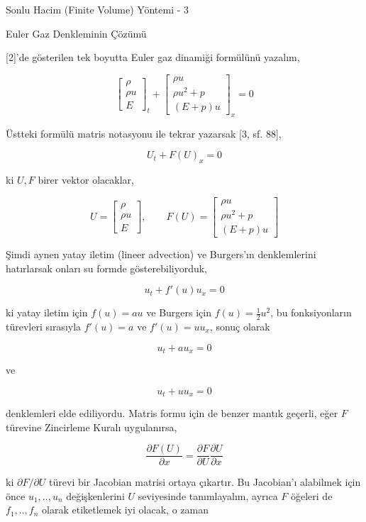 \documentclass[12pt,fleqn]{article}\usepackage{../../common}
\begin{document}
Sonlu Hacim (Finite Volume) Yöntemi - 3

Euler Gaz Denkleminin Çözümü

[2]'de gösterilen tek boyutta Euler gaz dinamiği formülünü yazalım,

$$
\left[\begin{array}{c}
\rho \\ \rho u  \\ E
\end{array}\right]_t
+
\left[\begin{array}{c}
\rho u \\ \rho u^2 + p \\ (E+p) u 
\end{array}\right]_x 
= 0
$$

Üstteki formülü matris notasyonu ile tekrar yazarsak [3, sf. 88],

$$
U_t + F(U)_x = 0
$$

ki $U,F$ birer vektor olacaklar,

$$
U = \left[\begin{array}{c}
\rho \\ \rho u  \\ E
\end{array}\right], \qquad
F(U) =
\left[\begin{array}{c}
\rho u \\ \rho u^2 + p \\ (E+p) u 
\end{array}\right]
$$

Şimdi aynen yatay iletim (lineer advection) ve Burgers'ın denklemlerini
hatırlarsak onları su formde gösterebiliyorduk,

$$
u_t + f'(u) u_x = 0
$$

ki yatay iletim için $f(u) = au$ ve Burgers için $f(u) = \frac{1}{2} u^2$,
bu fonksiyonların türevleri sırasıyla $f'(u) = a$ ve $f'(u) = u u_x$,
sonuç olarak

$$
u_t + a u_x = 0
$$

ve

$$
u_t + u u_x = 0
$$

denklemleri elde ediliyordu. Matris formu için de benzer mantık geçerli,
eğer $F$ türevine Zincirleme Kuralı uygulanırsa,

$$
\frac{\partial F(U)}{\partial x} =
\frac{\partial F}{\partial U} \frac{\partial U}{\partial x}
$$

ki $\partial F / \partial U$ türevi bir Jacobian matrisi ortaya çıkartır. Bu
Jacobian'ı alabilmek için önce $u_1,..,u_n$ değişkenlerini $U$ seviyesinde
tanımlayalım, ayrıca $F$ öğeleri de $f_1,..,f_n$ olarak etiketlemek iyi
olacak, o zaman 
\end{document}
